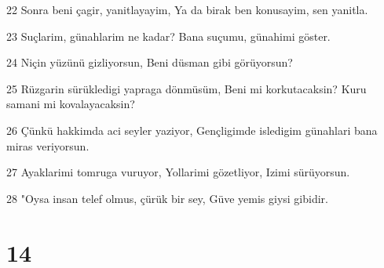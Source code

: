 \par 22 Sonra beni çagir, yanitlayayim, Ya da birak ben konusayim, sen yanitla.
\par 23 Suçlarim, günahlarim ne kadar? Bana suçumu, günahimi göster.
\par 24 Niçin yüzünü gizliyorsun, Beni düsman gibi görüyorsun?
\par 25 Rüzgarin sürükledigi yapraga dönmüsüm, Beni mi korkutacaksin? Kuru samani mi kovalayacaksin?
\par 26 Çünkü hakkimda aci seyler yaziyor, Gençligimde isledigim günahlari bana miras veriyorsun.
\par 27 Ayaklarimi tomruga vuruyor, Yollarimi gözetliyor, Izimi sürüyorsun.
\par 28 "Oysa insan telef olmus, çürük bir sey, Güve yemis giysi gibidir.

\chapter{14}


